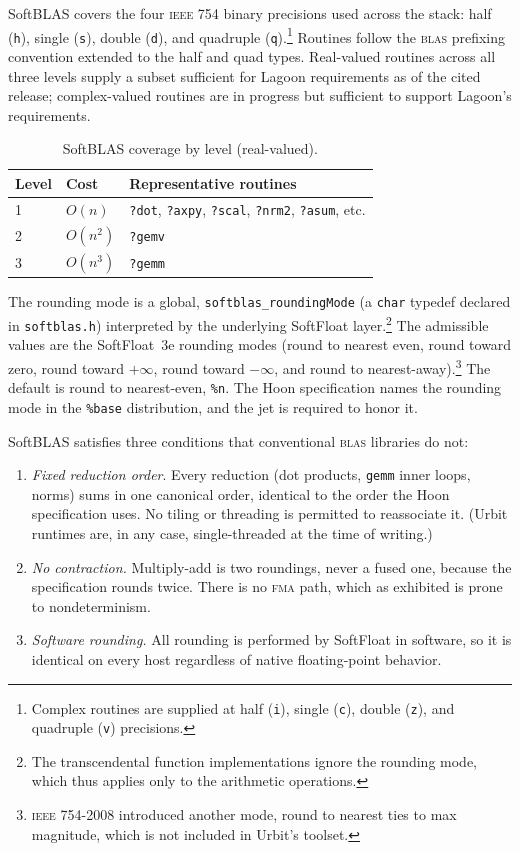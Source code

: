 \documentclass[twoside]{article}
\begin{document}
SoftBLAS covers the four \textsc{ieee} 754 binary precisions used across the stack:  half (\texttt{h}), single (\texttt{s}), double (\texttt{d}), and quadruple (\texttt{q}).\footnote{Complex routines are supplied at half (\texttt{i}), single (\texttt{c}), double (\texttt{z}), and quadruple (\texttt{v}) precisions.}  Routines follow the \textsc{blas} prefixing convention extended to the half and quad types.  Real-valued routines across all three levels supply a subset sufficient for Lagoon requirements as of the cited release; complex-valued routines are in progress but sufficient to support Lagoon's requirements.

\begin{table}[h]
\centering
\caption{SoftBLAS coverage by level (real-valued).}
\label{tab:coverage}
\begin{tabular}{@{}lll@{}}
\toprule
Level & Cost & Representative routines \\
\midrule
1 & $O(n)$   & \texttt{?dot}, \texttt{?axpy}, \texttt{?scal}, \texttt{?nrm2}, \texttt{?asum}, etc. \\
2 & $O(n^2)$ & \texttt{?gemv} \\
3 & $O(n^3)$ & \texttt{?gemm} \\
\bottomrule
\end{tabular}
\end{table}

The rounding mode is a global, \texttt{softblas\_roundingMode} (a \texttt{char} typedef declared in \texttt{softblas.h}) interpreted by the underlying SoftFloat layer.\footnote{The transcendental function implementations ignore the rounding mode, which thus applies only to the arithmetic operations.}  The admissible values are the SoftFloat~3e rounding modes (round to nearest even, round toward zero, round toward $+\infty$, round toward $-\infty$, and round to nearest-away).\footnote{\textsc{ieee} 754-2008 introduced another mode, round to nearest ties to max magnitude, which is not included in Urbit's toolset.}  The default is round to nearest-even, \texttt{\%n}.  The Hoon specification names the rounding mode in the \texttt{\%base} distribution, and the jet is required to honor it.

SoftBLAS satisfies three conditions that conventional \textsc{blas} libraries do not:
\begin{enumerate}
  \item \emph{Fixed reduction order}.  Every reduction (dot products,
    \texttt{gemm} inner loops, norms) sums in one canonical order, identical to the order the Hoon specification uses.  No tiling or threading is permitted to reassociate it.  (Urbit runtimes are, in any case, single-threaded at the time of writing.)
  \item \emph{No contraction.} Multiply-add is two roundings, never a fused one, because the specification rounds twice.  There is no \textsc{fma} path, which as \citet{Davis2024} exhibited is prone to nondeterminism.
  \item \emph{Software rounding.} All rounding is performed by SoftFloat in software, so it is identical on every host regardless of native floating-point behavior.
\end{enumerate}
\end{document}
